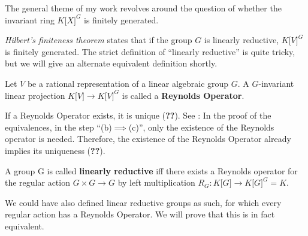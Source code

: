 The general theme of my work revolves around the question of whether the invariant ring $ K\lbrack X\rbrack^G $ is finitely generated.

\textit{Hilbert's finiteness theorem} states that if the group $G$ is linearly reductive, $ K\lbrack V\rbrack^G $ is finitely generated.
The strict definition of ``linearly reductive'' is quite tricky, but we will give an alternate equivalent definition shortly.

\begin{definition}
  Let $ V $ be a rational representation of a linear algebraic group $ G $.
  A $ G $-invariant linear projection $ K\lbrack V\rbrack \longrightarrow K\lbrack V\rbrack^G $ is called a \textbf{Reynolds Operator}.
\end{definition}

\begin{remark}
  If a Reynolds Operator exists, it is unique (\textbf{??}).
  See \cite[p.39f]{DK15}: In the proof of the equivalences, in the step ``(b)$\implies$(c)'', only the existence of the Reynolds operator is needed.
  Therefore, the existence of the Reynolds Operator already implies its uniqueness (\textbf{??}).
\end{remark}

\begin{definition}
  A group G is called \textbf{linearly reductive} iff there exists a Reynolds operator for the regular action $ G \times G \longrightarrow G $ by left multiplication $ R_G : K\lbrack G \rbrack \longrightarrow K\lbrack G \rbrack^G = K $.
\end{definition}

\begin{remark}
  We could have also defined linear reductive groups as such, for which every regular action has a Reynolds Operator.
  We will prove that this is in fact equivalent.
\end{remark}


